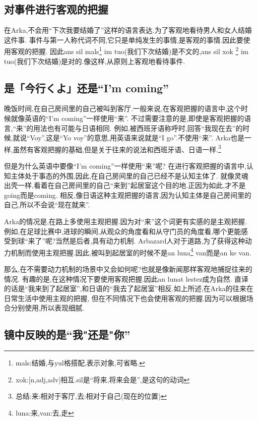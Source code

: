 \subsection{对事件进行客观的把握}

在Arka,不会用``下次我要结婚了''这样的语言表达.为了客观地看待男人和女人结婚这件事.
事件与第一人称代词不同,它只是单纯发生的事情,是客观的事情.因此要使用客观的把握.
因此ans sil mals\footnote{mals:结婚,与yul格搭配,表示对象,可省略.} im tuo(我们下次结婚)是不文的,ans sil xok
\footnote{xok:[n,adj,adv]相互.sil是``将来,将来会是'',是这句的动词} im tuo(我们下次结婚)是对的.像这样,从原则上客观地看待事件.
\subsection{是「今行くよ」还是``I'm coming''}
晚饭时间,在自己房间里的自己被叫到客厅.一般来说,在客观把握的语言中,这个时候就像英语的``I'm coming''一样使用``来''.
不过需要注意的是,即使是客观把握的语言,``来''的用法也有可能与日语相同.
例如,被西班牙语称呼时,回答``我现在去''的时候,就说``Voy''.这是``Yo voy''的意思,用英语来说就是``I go''.不使用``来''.
Arka也是一样,虽然有客观把握的基础,但是关于往来的说法和西班牙语、日语一样.\footnote{总结:\quad 来:相对于客厅,去:相对于自己(现在的位置)}

但是为什么英语中要像``I'm coming''一样使用``来''呢?
在进行客观把握的语言中,认知主体处于事态的外围,因此,在自己房间里的自己已经不是认知主体了.
就像灵魂出壳一样,看着在自己房间里的自己``来到''起居室这个目的地.正因为如此,才不是going而是coming.
相反,像日语这种主观把握的语言,因为认知主体是自己房间里的自己,所以不会说``现在就来''.

Arka的情况是,在路上多使用主观把握.因为对``来''这个词更有实感的是主观把握.
例如,在足球比赛中,进球的瞬间,从观众的角度看和从守门员的角度看,哪个更能感受到球``来了''呢?当然是后者,具有动力机制.
Arbazard人对于道路,为了获得这种动力机制而使用主观把握.因此,被叫到起居室的时候不是an luna\footnote{luna:来,van:去,走} van而是an ke van.

那么,在不需要动力机制的场景中又会如何呢?也就是像新闻那样客观地捕捉往来的情况.
有趣的是,在这种情况下要使用客观把握.因此an lunat lestez成为自然.
直译的话是``我来到了起居室'',和日语的``我去了起居室''相反.如上所述,在Arka的往来在日常生活中使用主观的把握,
但在不同情况下也会使用客观的把握.因为可以根据场合分别使用,所以表现细腻.

\subsection{镜中反映的是``我"还是"你''}

